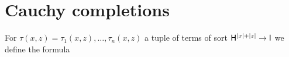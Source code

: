 \documentclass{amsproc}
\begin{document}
{\begin{comment}
\begin{proof}
  Let $\varphi(x)$ be a positive formula.
  We need to prove that for every $\varphi'>\varphi$ there is some formula $\psi(x)\in{\EuScript L}^{\rm p}_{{\sf I}{\rm qf}}$ such that $\varphi(x)\rightarrow\psi(x)\rightarrow\varphi'(x)$.
  By Corollary~\ref{corol_Lcomplete} and Proposition~\ref{prop_approx}

  \ceq{\hfill\neg\varphi(x)}{\rightarrow}{\bigvee_{p'(x)\rightarrow\neg\varphi(x)}p'(x)}

  where $p(x)$ ranges over the maximally consistent ${\EuScript L}^{\rm p}_{{\sf I}{\rm qf}}$-types.
  By Fact~\ref{fact_compactness_imp} and Lemma~\ref{lem_interpolation}

  \ceq{\hfill\neg\varphi(x)}{\rightarrow}{\bigvee_{\neg\tilde{\psi}(x)\rightarrow\neg\varphi(x)}\neg\tilde{\psi}(x),}

  where $\tilde{\psi}(x)\in{\EuScript L}^{\rm p}_{{\sf I}{\rm qf}}$.
  Equivalently,

  \ceq{\hfill\varphi(x)}{\leftarrow}{\bigwedge_{\tilde{\psi}(x)\leftarrow\varphi(x)}\tilde{\psi}(x).}

  By compactness, see Fact~\ref{fact_compactness_imp}, for every $\varphi'>\varphi$ there are some finitely many $\tilde{\psi}_i(x)\in{\EuScript L}^{\rm p}_{{\sf I}{\rm qf}}$ such that

  \ceq{\hfill\varphi'(x)}{\leftarrow}{\bigwedge_{i=1,\dots,n}\tilde{\psi}_i(x)\ \ \leftarrow\ \ \varphi(x)}

  which yields the interpolant required by the proposition.
\end{proof}


  
\end{comment}

\section{Cauchy completions}\label{Cauchy}

For $\tau(x,z)=\tau_1(x,z),\dots,\tau_n(x,z)$ a tuple of terms of sort ${\sf H}^{|x|+|z|}\to {\sf I}$ we define the formula

}
\end{document}
